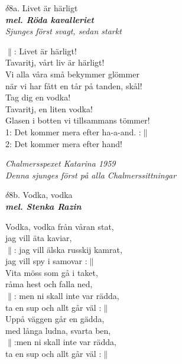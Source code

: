 \documentclass[a6paper,10pt]{article}
\newcommand{\mel}[1]{\small\textbf{\textit{mel. #1 \\}}}
\begin{document}
\setlength{\oddsidemargin}{-0.47in}
\noindent
\begin{center}
\Large $\delta8$a. Livet är härligt\\ 
\mel{Röda kavalleriet}
\textit{Sjunges först svagt, sedan starkt}
\end{center}
$\|$: Livet är härligt!\\
Tavaritj, vårt liv är härligt!\\
Vi alla våra små bekymmer glömmer\\
när vi har fått en tår på tanden, skål!\\
Tag dig en vodka!\\
Tavaritj, en liten vodka!\\
Glasen i botten vi tillsammans tömmer! 
\vspace{5pt}\\
1: Det kommer mera efter ha-a-and. :$\|$
\vspace{5pt}\\
2: Det kommer mera efter hand! 
\begin{flushright}
\textit{Chalmersspexet Katarina 1959\\Denna sjunges först på alla Chalmerssittningar}
\end{flushright}
\begin{center}
\Large $\delta8$b. Vodka, vodka\\ 
\mel{Stenka Razin}
\end{center}
Vodka, vodka från våran stat, \\
jag vill äta kaviar, \\
$\|$: jag vill älska russkij kamrat, \\
jag vill spy i samovar :$\|$
\vspace{5pt}\\
Vita möss som gå i taket, \\
råma hest och falla ned, \\
$\|$: men ni skall inte var rädda, \\
ta en sup och allt går väl :$\|$
\vspace{5pt}\\
Uppå väggen går en gädda, \\
med långa ludna, svarta ben, \\
$\|$:men ni skall inte var rädda, \\
ta en sup och allt går väl :$\|$
\end{document}
